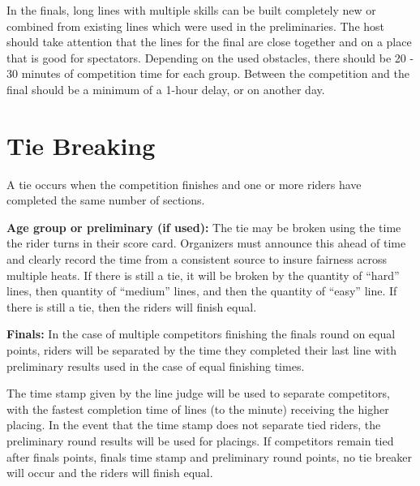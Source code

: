 In the finals, long lines with multiple skills can be built completely new or combined from existing lines which were used in the preliminaries.
The host should take attention that the lines for the final are close together and on a place that is good for spectators.
Depending on the used obstacles, there should be 20 - 30 minutes of competition time for each group.
Between the competition and the final should be a minimum of a 1-hour delay, or on another day.

\section{Tie Breaking}
A tie occurs when the competition finishes and one or more riders have completed the same number of sections.

\textbf{Age group or preliminary (if used):} The tie may be broken using the time the rider turns in their score card.
Organizers must announce this ahead of time and clearly record the time from a consistent source to insure fairness across multiple heats.
If there is still a tie, it will be broken by the quantity of ``hard'' lines, then quantity of ``medium'' lines, and then the quantity of ``easy'' line.
If there is still a tie, then the riders will finish equal.

\textbf{Finals:} In the case of multiple competitors finishing the finals round on equal points, riders will be separated by the time they completed their last line with preliminary results used in the case of equal finishing times.

The time stamp given by the line judge will be used to separate competitors, with the fastest completion time of lines (to the minute) receiving the higher placing.
In the event that the time stamp does not separate tied riders, the preliminary round results will be used for placings.
If competitors remain tied after finals points, finals time stamp and preliminary round points, no tie breaker will occur and the riders will finish equal.
